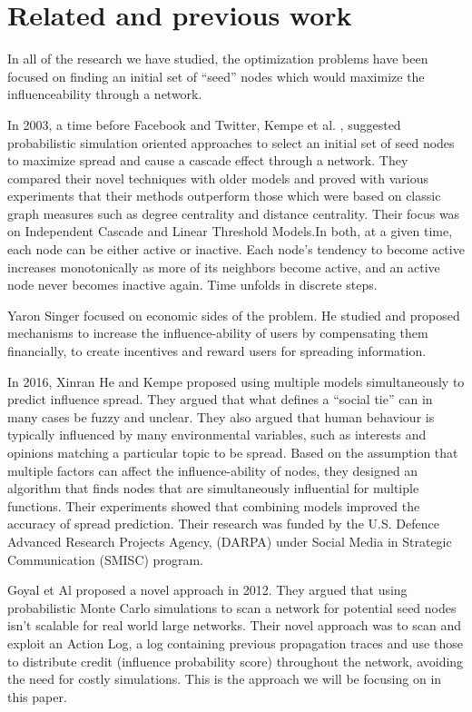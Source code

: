 \documentclass{acm_proc_article-sp}
\begin{document}
\section{Related and previous work}

In all of the research we have studied, the optimization problems have been focused on finding an initial set of “seed” nodes which would maximize the influenceability through a network. 

In 2003, a time before Facebook and Twitter, Kempe et al. \cite{kempe:maxspread}, suggested probabilistic simulation oriented approaches to select an initial set of seed nodes to maximize spread and cause a cascade effect through a network. They compared their novel techniques with older models and proved with various experiments that their methods outperform those which were based on classic graph measures such as degree centrality and distance centrality. Their focus was on Independent Cascade and Linear Threshold Models.In both, at a given time, each node can be either active or inactive. Each node's tendency to become active increases monotonically as more of its neighbors become active, and an active node never becomes inactive again. Time unfolds in discrete steps.

Yaron Singer \cite{singer:winfriends} focused on economic sides of the problem. He studied and proposed mechanisms to increase the influence-ability of users by compensating them financially, to create incentives and reward users for spreading information.

In 2016, Xinran He and Kempe \cite{DBLP:journals/corr/HeK16} proposed using multiple models simultaneously to predict influence spread. They argued that what defines a “social tie” can in many cases be fuzzy and unclear. They also argued that human behaviour is typically influenced by many environmental variables, such as interests and opinions matching a particular topic to be spread. Based on the assumption that multiple factors can affect the influence-ability of nodes, they designed an algorithm that finds nodes that are simultaneously influential for multiple functions. Their experiments showed that combining models improved the accuracy of spread prediction. Their research was funded by the U.S. Defence Advanced Research Projects Agency, (DARPA) under Social Media in Strategic Communication (SMISC) program.


Goyal et Al \cite{goyal:datainfluence} proposed a novel approach in 2012. They argued that using probabilistic Monte Carlo simulations to scan a network for potential seed nodes isn't scalable for real world large networks. Their novel approach was to scan and exploit an Action Log, a log containing previous propagation traces and use those to distribute credit (influence probability score) throughout the network, avoiding the need for costly simulations. This is the approach we will be focusing on in this paper.
\end{document}
